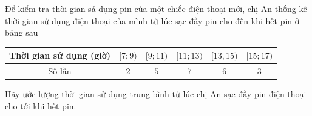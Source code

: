 \begin{ex}%
	Để kiểm tra thời gian sả dụng pin của một chiếc điện thoại mới, chị An thống kê  thời gian sử dụng điện thoại của mình từ lúc sạc đầy pin cho đến khi hết pin ở bảng sau
	\begin{center}
		\begin{tabular}{|c|c|c|c|c|c|}
			\hline Thời gian sử dụng (giờ) & $[7;9)$ & $[9;11)$ & $[11;13)$ & $[13,15)$  & $[15;17)$ \\
			 \hline Số lần & $2$ & $5$ & $7$ & $6$ & $3$ \\
			 \hline
		\end{tabular}
	\end{center}
	Hãy ước lượng thời gian sử dụng trung bình từ lúc chị An sạc đầy  pin điện thoại cho tới khi hết pin.
\end{ex}

